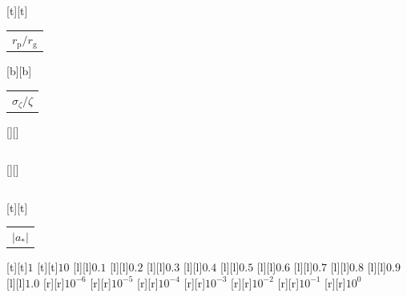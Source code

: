 %    
%
%
\begin{psfrags}%
\psfragscanon%
%
[t][t]{\color[rgb]{0,0,0}\setlength{\tabcolsep}{0pt}\begin{tabular}{c}{\Large$r_\mathrm{p}/r_\mathrm{g}$}\end{tabular}}%
[b][b]{\color[rgb]{0,0,0}\setlength{\tabcolsep}{0pt}\begin{tabular}{c}{\Large$\sigma_\zeta/\zeta$}\end{tabular}}%
[][]{\color[rgb]{0,0,0}\setlength{\tabcolsep}{0pt}\begin{tabular}{c} \end{tabular}}%
[][]{\color[rgb]{0,0,0}\setlength{\tabcolsep}{0pt}\begin{tabular}{c} \end{tabular}}%
[t][t]{\color[rgb]{0,0,0}\setlength{\tabcolsep}{0pt}\begin{tabular}{c}{\Large$\left|a_\ast\right|$}\end{tabular}}%
%
[t][t]{$1$}%
[t][t]{$10$}%
%
[l][l]{$0.1$}%
[l][l]{$0.2$}%
[l][l]{$0.3$}%
[l][l]{$0.4$}%
[l][l]{$0.5$}%
[l][l]{$0.6$}%
[l][l]{$0.7$}%
[l][l]{$0.8$}%
[l][l]{$0.9$}%
[l][l]{$1.0$}%
[r][r]{$10^{-6}$}%
[r][r]{$10^{-5}$}%
[r][r]{$10^{-4}$}%
[r][r]{$10^{-3}$}%
[r][r]{$10^{-2}$}%
[r][r]{$10^{-1}$}%
[r][r]{$10^{0}$}%
%
%
\end{psfrags}%
%
